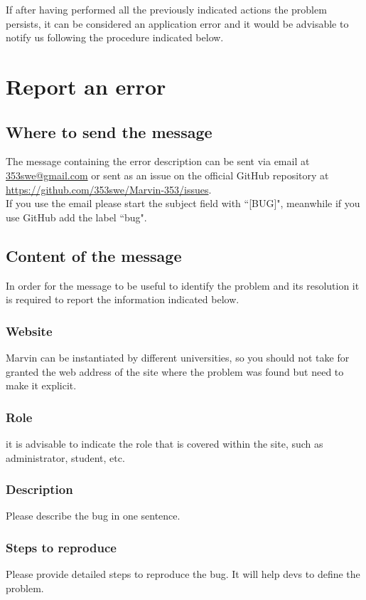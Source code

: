 \documentclass[ManualeUtente]{subfiles}
\begin{document}
If after having performed all the previously indicated actions the problem persists, it can be considered an application error and it would be advisable to notify us following the procedure indicated below.

\section{Report an error}
\subsection{Where to send the message}
The message containing the error description can be sent via email at \href{mailto: 353swe@gmail.com}{ 353swe@gmail.com} or sent as an issue on the official GitHub repository at \href{https://github.com/353swe/Marvin-353/issues}{https://github.com/353swe/Marvin-353/issues}. \\
If you use the email please start the subject field with ``[BUG]", meanwhile if you use GitHub add the label ``bug".

\subsection{Content of the message}
In order for the message to be useful to identify the problem and its resolution it is required to report the information indicated below.

\subsubsection{Website}
Marvin can be instantiated by different universities, so you should not take for granted the web address of the site where the problem was found but need to make it explicit.

\subsubsection{Role}
it is advisable to indicate the role that is covered within the site, such as administrator, student, etc.

\subsubsection{Description}
Please describe the bug in one sentence.

\subsubsection{Steps to reproduce}
Please provide detailed steps to reproduce the bug. It will help devs to define the problem.
\end{document}
